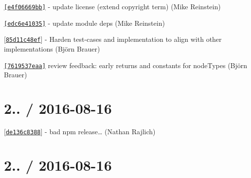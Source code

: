 
\begin{DoxyItemize}
\item \href{https://github.com/TooTallNate/plist.js/commit/e4f06669bb51d2e65654df7c39aab52bc3bf4e8a}{\tt \mbox{[}{\ttfamily e4f06669bb}\mbox{]}} -\/ update license (extend copyright term) (Mike Reinstein)
\item \href{https://github.com/TooTallNate/plist.js/commit/edc6e4103546b1d7518a577e7c202c305a8abec0}{\tt \mbox{[}{\ttfamily edc6e41035}\mbox{]}} -\/ update module deps (Mike Reinstein)
\item \mbox{[}\href{https://github.com/TooTallNate/plist.js/commit/85d11c48eff02312cbdd67f46fd8e74b0d372ca1}{\tt {\ttfamily 85d11c48ef}}\mbox{]} -\/ Harden test-\/cases and implementation to align with other implementations (Björn Brauer)
\item \href{https://github.com/TooTallNate/plist.js/commit/7619537eaa9e3e5a80829e759c004d2e017a07d2}{\tt \mbox{[}{\ttfamily 7619537eaa}\mbox{]}} review feedback\+: early returns and constants for node\+Types (Björn Brauer)
\end{DoxyItemize}

\section*{2.. / 2016-\/08-\/16 }


\begin{DoxyItemize}
\item \mbox{[}\href{https://github.com/TooTallNate/plist/commit/de136c8388}{\tt {\ttfamily de136c8388}}\mbox{]} -\/ bad npm release… (Nathan Rajlich)
\end{DoxyItemize}

\section*{2.. / 2016-\/08-\/16 }


